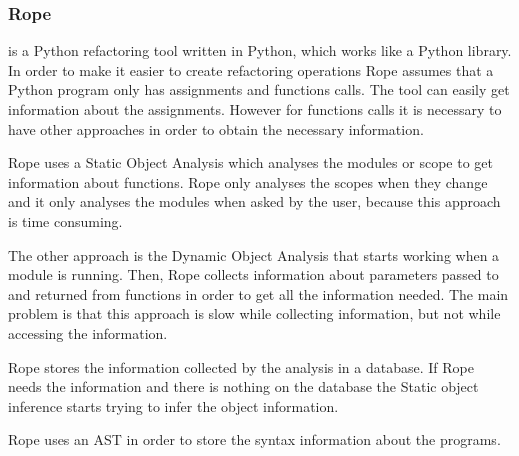 
\subsubsection{Rope}

 is a Python refactoring tool written in Python, which works like a Python library.
In order to make it easier to create refactoring operations Rope assumes that a Python program only has assignments and functions calls. %
The tool can easily get information about the assignments. 
However for functions calls it is necessary to have other approaches in order to obtain the necessary information. 

Rope uses a Static Object Analysis which analyses the modules or scope to get information about functions. 
Rope only analyses the scopes when they change and it only analyses the modules when asked by the user, because this approach is time consuming. 

The other approach is the Dynamic Object Analysis that starts working when a module is running. 
Then, Rope collects information about parameters passed to and returned from functions in order to get all the information needed. 
The main problem is that this approach is slow while collecting information, but not while accessing the information.

Rope stores the information collected by the analysis in a database. 
If Rope needs the information and there is nothing on the database the Static object inference starts trying to infer the object information.

Rope uses an AST in order to store the syntax information about the programs.






